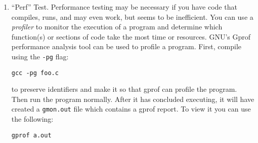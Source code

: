 \documentclass[12pt]{scrartcl}
\begin{document}
\begin{enumerate}
  
  \item ``Perf'' Test.  Performance testing may be necessary if you have 
  code that compiles, runs, and may even work, but seems to be inefficient.
  You can use a \emph{profiler} to monitor the execution of a program
  and determine which function(s) or sections of code take the most time
  or resources.  GNU's Gprof performance analysis tool can be used to
  profile a program.  First, compile using the \texttt{-pg} flag:
  
  \texttt{gcc -pg foo.c}
  
  to preserve identifiers and make it so that gprof can profile the 
  program.  Then run the program normally.  After it has concluded 
  executing, it will have created a \texttt{gmon.out} file
  which contains a gprof report.  To view it you can use the following:
  
  \texttt{gprof a.out}
  
  
\end{enumerate}
\end{document}
